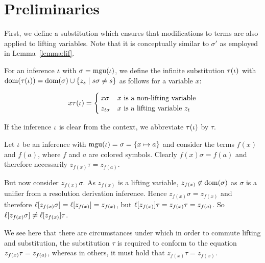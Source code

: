 
\section{Preliminaries}

First, we define a substitution which ensures that modifications to terms are also applied to lifting variables. Note that it is conceptually similar to $\sigma'$ as employed in Lemma~\ref{lemma:lif}.

\begin{defi}
	For an inference $\iota$ with $\sigma = \operatorname{mgu}(\iota)$, we define the infinite substitution $\tau(\iota)$ with $\operatorname{dom}(\tau(\iota)) = \operatorname{dom}(\sigma) \cup \{z_s \mid s\sigma \neq s\}$ as follows for a variable $x$:

	\[
		x\tau(\iota) =
		\begin{cases}
			x\sigma & \text{$x$ is a non-lifting variable} \\
			z_{t\sigma} & \text{$x$ is a lifting variable $z_t$}
		\end{cases} 
	\]

	If the inference $\iota$ is clear from the context, we abbreviate $\tau(\iota)$ by $\tau$. 
\end{defi}





\begin{exa}
	Let $\iota$ be an inference with $\operatorname{mgu}(\iota) = \sigma = \{x \mapsto a\}$
	and consider the terms $f(x)$ and $f(a)$, where $f$ and $a$ are colored symbols.
	Clearly $f(x)\sigma = f(a)$ and therefore necessarily $z_{f(x)}\tau = z_{f(a)}$.

	But now consider $z_{f(x)} \sigma$.
	As $z_{f(x)}$ is a lifting variable, $z_{f(x)} \not\in \operatorname{dom}(\sigma)$ as $\sigma$ is a unifier from a resolution derivation inference.
	Hence $z_{f(x)}\sigma = z_{f(x)}$ and therefore $\ell[z_{f(x)}\sigma] = \ell[z_{f(x)}] = z_{f(x)}$, but $\ell[z_{f(x)}]\tau = z_{f(x)}\tau = z_{f(a)}$.
	So $\ell[z_{f(x)}\sigma] \neq \ell[z_{f(x)}]\tau$.

	We see here that there are circumstances under which in order to commute lifting and substitution,
	the substitution $\tau$ is required to conform to the equation
	$z_{f(x)}\tau =\nolinebreak z_{f(a)}$,
	whereas in others, it must hold that
	$z_{f(x)}\tau = z_{f(x)}$.
\end{exa}

